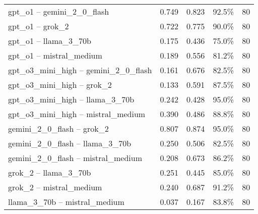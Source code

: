 \begin{table}[htbp]
\begin{tabular}{lcccc}
gpt\_o1 -- gemini\_2\_0\_flash & 0.749 & 0.823 & 92.5\% & 80 \\
gpt\_o1 -- grok\_2 & 0.722 & 0.775 & 90.0\% & 80 \\
gpt\_o1 -- llama\_3\_70b & 0.175 & 0.436 & 75.0\% & 80 \\
gpt\_o1 -- mistral\_medium & 0.189 & 0.556 & 81.2\% & 80 \\
gpt\_o3\_mini\_high -- gemini\_2\_0\_flash & 0.161 & 0.676 & 82.5\% & 80 \\
gpt\_o3\_mini\_high -- grok\_2 & 0.133 & 0.591 & 87.5\% & 80 \\
gpt\_o3\_mini\_high -- llama\_3\_70b & 0.242 & 0.428 & 95.0\% & 80 \\
gpt\_o3\_mini\_high -- mistral\_medium & 0.390 & 0.486 & 88.8\% & 80 \\
gemini\_2\_0\_flash -- grok\_2 & 0.807 & 0.874 & 95.0\% & 80 \\
gemini\_2\_0\_flash -- llama\_3\_70b & 0.250 & 0.506 & 82.5\% & 80 \\
gemini\_2\_0\_flash -- mistral\_medium & 0.208 & 0.673 & 86.2\% & 80 \\
grok\_2 -- llama\_3\_70b & 0.251 & 0.445 & 85.0\% & 80 \\
grok\_2 -- mistral\_medium & 0.240 & 0.687 & 91.2\% & 80 \\
llama\_3\_70b -- mistral\_medium & 0.037 & 0.167 & 83.8\% & 80 \\
\bottomrule
\end{tabular}
\end{table}
